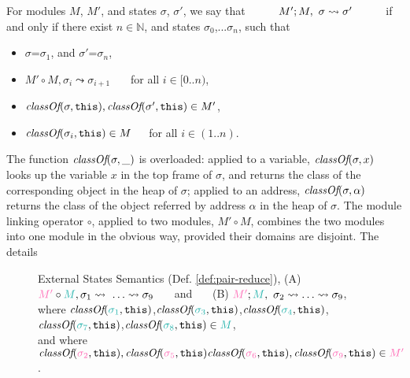 \begin{definition}
\label{def:pair-reduce}
For  
  modules $M$,  $M'$, and %
   states $\sigma$, $\sigma'$, 
we say that $\ \ \ \ \ \ \ \ \reduction{M'}{M}{\sigma}{\sigma'}\ \ \ \ \ \ \ \ $ if and only if there exist 
$n\in\mathbb{N}$, and states $\sigma_0$,...$\sigma_n$, such that
\begin{itemize}
\item
$\sigma$=$\sigma_1$, and  $\sigma'$=$\sigma_n$,
\item
$M' \circ M, \sigma_i \leadsto \sigma_{i+1}$  \ \ \ for all $i\in [0..n)$,
\item
$\textit{classOf}(\sigma, {{{\texttt{this}}}}), \textit{classOf}(\sigma', {{{\texttt{this}}}})\in M'$,
\item
$\textit{classOf}(\sigma_i, {{{\texttt{this}}}}) \in M$\ \ \ for all $i\in (1..n)$.
\end{itemize} 
\end{definition}
The function $\textit{classOf}(\sigma, \_)$ is overloaded:
  applied to a variable, 
$\textit{classOf}(\sigma, x)$  looks up the variable $x$ in the top frame of $\sigma$, and returns the 
class of the corresponding object in the  heap of $\sigma$;
applied to an address, $\textit{classOf}(\sigma, \alpha)$  returns
the class of   the object referred by address $\alpha$ in the heap of $\sigma$.
 The module linking operator $\circ$, applied to two modules, $M'\circ M$, 
 combines the two modules into one module in the obvious way, provided their
domains are disjoint.
The details  %
\begin{figure}[htb]
\resizebox{\textwidth}{!}{

}
   \caption{External States Semantics
     (Def. \ref{def:pair-reduce}),  %
     (A) $\exec{{\color{hotpink}M'} \circ {\color{lightseagreen}M}}{\sigma_1}{\ldots}\leadsto \sigma_9$ \ \ \ and \ \ \ 
     (B) $\reduction{{\color{hotpink}M'}}{{\color{lightseagreen}M}}{\sigma_2}{\ldots}\leadsto \sigma_9$, \ \ \ 
     \\
     where $\class{{\color{lightseagreen}\sigma_1}}{\scd{\prg{this}}}$,$\class{{\color{lightseagreen}\sigma_3}}{\scd{\prg{this}}}$,$\class{{\color{lightseagreen}\sigma_4}}{\scd{\prg{this}}}$,$\class{{\color{lightseagreen}\sigma_7}}{\scd{\prg{this}}}$,$\class{{\color{lightseagreen}\sigma_8}}{\scd{\prg{this}}}\in {\color{lightseagreen}M}$,\\
     and where $\class{{\color{hotpink}\sigma_2}}{\scd{\prg{this}}},\class{{\color{hotpink}\sigma_5}}{\scd{\prg{this}}} 
     \class{{\color{hotpink}\sigma_6}}{\scd{\prg{this}}},\class{{\color{hotpink}\sigma_9}}{\scd{\prg{this}}}\in {\color{hotpink}M'}$.
    }
   \label{fig:VisibleStates}
 \end{figure}
 
